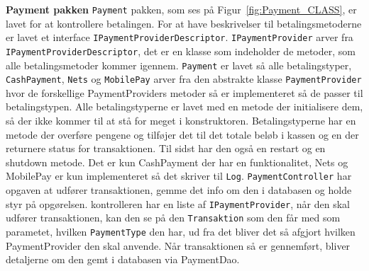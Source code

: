 \textbf{Payment pakken}
\newline
\texttt{Payment} pakken, som ses på Figur~\ref{fig:Payment_CLASS}, er lavet for at kontrollere betalingen. For at have beskrivelser til betalingsmetoderne  er lavet et interface \texttt{IPaymentProviderDescriptor}. \texttt{IPaymentProvider} arver fra \texttt{IPaymentProviderDescriptor}, det er en klasse som indeholder de metoder, som alle betalingsmetoder kommer igennem. \texttt{Payment} er lavet så alle betalingstyper, \texttt{CashPayment}, \texttt{Nets} og \texttt{MobilePay} arver fra den abstrakte klasse \texttt{PaymentProvider} hvor de forskellige PaymentProviders metoder så er implementeret så de passer til betalingstypen. 
\newline
\newline
Alle betalingstyperne er lavet med en metode der initialisere dem, så der ikke kommer til at stå for meget i konstruktoren. Betalingstyperne har en metode der overføre pengene og tilføjer det til det totale beløb i kassen og en der returnere status for transaktionen. Til sidst har den også en restart og en shutdown metode. Det er kun CashPayment der har en funktionalitet, Nets og MobilePay er kun implementeret så det skriver til \texttt{Log}.  
\newline
\newline
\texttt{PaymentController} har opgaven at udfører transaktionen, gemme det info om den i databasen og holde styr på opgørelsen. kontrolleren har en liste af \texttt{IPaymentProvider}, når den skal udfører transaktionen, kan den se på den \texttt{Transaktion} som den får med som parametet, hvilken \texttt{PaymentType} den har, ud fra det bliver det så afgjort hvilken PaymentProvider den skal anvende. Når transaktionen så er gennemført, bliver detaljerne om den gemt i databasen via PaymentDao. 

